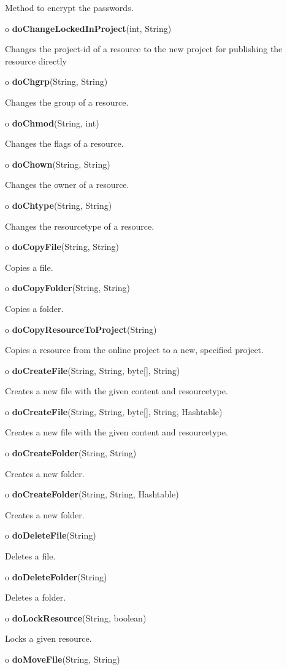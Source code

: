 \begin{description}
Method to encrypt the passwords.  
\item o {\bf doChangeLockedInProject}(int, String)  

Changes the project-id of a resource to the new project for publishing the
resource directly  
\item o {\bf doChgrp}(String, String)  

Changes the group of a resource.  
\item o {\bf doChmod}(String, int)  

Changes the flags of a resource.  
\item o {\bf doChown}(String, String)  

Changes the owner of a resource.  
\item o {\bf doChtype}(String, String)  

Changes the resourcetype of a resource.  
\item o {\bf doCopyFile}(String, String)  

Copies a file.  
\item o {\bf doCopyFolder}(String, String)  

Copies a folder.  
\item o {\bf doCopyResourceToProject}(String)  

Copies a resource from the online project to a new, specified project.  
\item o {\bf doCreateFile}(String, String, byte[], String)  

Creates a new file with the given content and resourcetype.\htmlBR
\item o {\bf doCreateFile}(String, String, byte[], String, Hashtable)  

Creates a new file with the given content and resourcetype.  
\item o {\bf doCreateFolder}(String, String)  

Creates a new folder.  
\item o {\bf doCreateFolder}(String, String, Hashtable)  

Creates a new folder.  
\item o {\bf doDeleteFile}(String)  

Deletes a file.  
\item o {\bf doDeleteFolder}(String)  

Deletes a folder.  
\item o {\bf doLockResource}(String, boolean)  

Locks a given resource.  
\item o {\bf doMoveFile}(String, String)  


\end{description}
